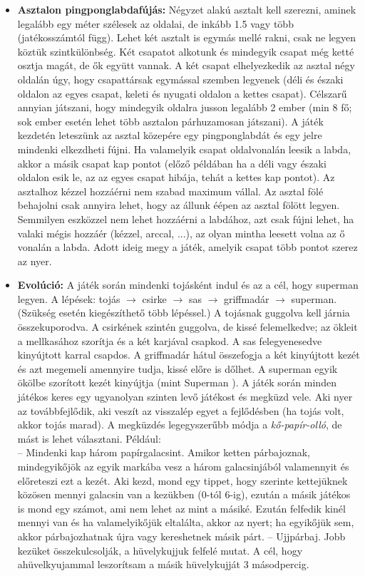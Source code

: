 \documentclass[a4paper, 12pt, twoside, openright]{article}
\begin{document}
\begin{itemize}
\item \textbf{Asztalon pingponglabdafújás:} Négyzet alakú asztalt kell szerezni, aminek legalább egy méter szélesek az oldalai, de inkább 1.5 vagy több (jatékosszámtól függ). Lehet két asztalt is egymás mellé rakni, csak ne legyen köztük szintkülönbség. Két csapatot alkotunk és mindegyik csapat még ketté osztja magát, de ők együtt vannak. A két csapat elhelyezkedik az asztal négy oldalán úgy, hogy csapattársak egymással szemben legyenek (déli és északi oldalon az egyes csapat, keleti és nyugati oldalon a kettes csapat). Célszarű annyian játszani, hogy mindegyik oldalra jusson legalább 2 ember (min 8 fő; sok ember esetén lehet több asztalon párhuzamosan játszani). A játék kezdetén leteszünk az asztal közepére egy pingponglabdát és egy jelre mindenki elkezdheti fújni. Ha valamelyik csapat oldalvonalán leesik a labda, akkor a másik csapat kap pontot (előző példában ha a déli vagy északi oldalon esik le, az az egyes csapat hibája, tehát a kettes kap pontot). Az asztalhoz kézzel hozzáérni nem szabad maximum vállal. Az asztal fölé behajolni csak annyira lehet, hogy az állunk éépen az asztal fölött legyen. Semmilyen eszközzel nem lehet hozzáérni a labdához, azt csak fújni lehet, ha valaki mégis hozzáér (kézzel, arccal, ...), az olyan mintha leesett volna az ő vonalán a labda. Adott ideig megy a játék, amelyik csapat több pontot szerez az nyer.

\item \textbf{Evolúció:} A játék során mindenki tojásként indul és az a cél, hogy superman legyen. A lépések: tojás $\to$ csirke $\to$ sas $\to$ griffmadár $\to$ superman. (Szükség esetén kiegészíthető több lépéssel.) A tojásnak guggolva kell járnia összekuporodva. A csirkének szintén guggolva, de kissé felemelkedve; az ökleit a mellkasához szorítja és a két karjával csapkod. A sas felegyenesedve kinyújtott karral csapdos. A griffmadár hátul összefogja a két kinyújtott kezét és azt megemeli amennyire tudja, kissé előre is dőlhet. A superman egyik ökölbe szorított kezét kinyújtja (mint Superman \Smiley). A játék során minden játékos keres egy ugyanolyan szinten levő játékost és megküzd vele. Aki nyer az továbbfejlődik, aki veszít az visszalép egyet a fejlődésben (ha tojás volt, akkor tojás marad). A megküzdés legegyszerűbb módja a \emph{kő-papír-olló}, de mást is lehet választani. Például: \\
-- Mindenki kap három papírgalacsint. Amikor ketten párbajoznak, mindegyikőjök az egyik markába vesz a három galacsinjából valamennyit és előreteszi ezt a kezét. Aki kezd, mond egy tippet, hogy szerinte kettejüknek közösen mennyi galacsin van a kezükben (0-tól 6-ig), ezután a másik játékos is mond egy számot, ami nem lehet az mint a másiké. Ezután felfedik kinél mennyi van és ha valamelyikőjük eltalálta, akkor az nyert; ha egyikőjük sem, akkor párbajozhatnak újra vagy kereshetnek másik párt.
-- Ujjpárbaj. Jobb kezüket összekulcsolják, a hüvelykujjuk felfelé mutat. A cél, hogy ahüvelkyujammal leszorítsam a másik hüvelykujját 3 másodpercig.


\end{itemize}
\end{document}
